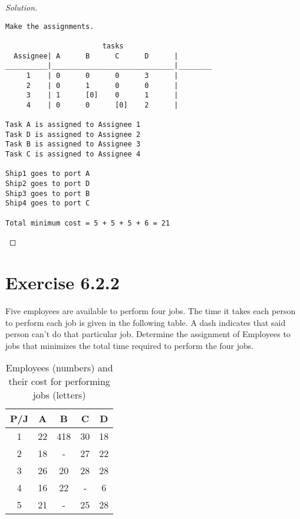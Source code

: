 \documentclass[titlepage, letterpaper, fleqn]{article}
\renewcommand\qedsymbol{\(\blacksquare\)}
\newenvironment{solution}
{\renewcommand\qedsymbol{$\square$}\begin{proof}[Solution]}
{\end{proof}}
\begin{document}
\begin{solution}
\begin{lstlisting}[basicstyle=\tiny]
Make the assignments.

                       tasks
  Assignee| A      B      C      D      |
__________|_____________________________|________
     1    | 0      0      0      3      | 
     2    | 0      1      0      0      | 
     3    | 1      [0]    0      1      | 
     4    | 0      0      [0]    2      | 

Task A is assigned to Assignee 1
Task D is assigned to Assignee 2
Task B is assigned to Assignee 3
Task C is assigned to Assignee 4

Ship1 goes to port A
Ship2 goes to port D
Ship3 goes to port B
Ship4 goes to port C

Total minimum cost = 5 + 5 + 5 + 6 = 21
\end{lstlisting}
\end{solution}

\section{Exercise 6.2.2}
{\large Five employees are available to perform four jobs.
The time it takes each person to perform each job is given in the following table.
A dash indicates that said person can't do that particular job.
Determine the assignment of Employees to jobs that minimizes the total time required to perform the four jobs.}

\begin{table}[h!]
\centering
\begin{tabular}{@{}ccccc@{}}
\toprule
P/J & A  & B   & C  & D  \\ \midrule
1   & 22 & 418 & 30 & 18 \\
2   & 18 & -   & 27 & 22 \\
3   & 26 & 20  & 28 & 28 \\
4   & 16 & 22  & -  & 6  \\
5   & 21 & -   & 25 & 28 \\ \bottomrule
\end{tabular}
\caption{Employees (numbers) and their cost for performing jobs (letters)}
\label{tab:6_2_2}
\end{table}
\end{document}
